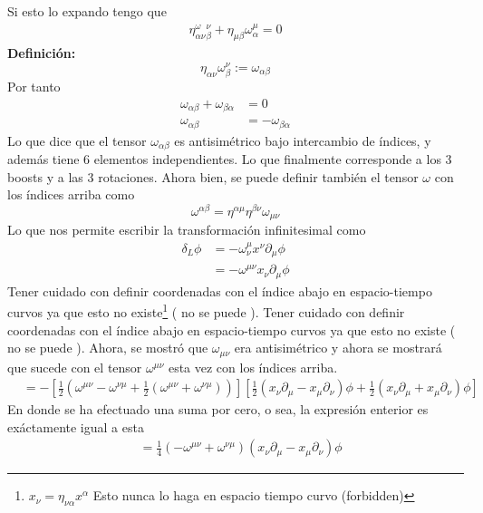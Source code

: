 \documentclass[../main.tex]{subfiles}
\begin{document}
 Si esto lo expando tengo que
 \begin{align*}
   \eta_{\alpha \nu }^\omega^\nu_\beta + \eta_{\mu \beta}\omega^\mu_\alpha = 0
 \end{align*}
 \textbf{Definición:}
 \begin{equation}
   \boxed{ \eta_{\alpha \nu}\omega^\nu_\beta := \omega_{\alpha \beta}}
  \end{equation}
Por tanto
\begin{align*}
  \omega_{\alpha \beta} + \omega_{\beta \alpha}&  = 0 \\
  \omega_{\alpha \beta} & = -\omega_{\beta \alpha}
\end{align*}
Lo que dice que el tensor $\omega_{\alpha \beta}$ es antisimétrico bajo intercambio de índices, y además tiene 6 elementos independientes. Lo que finalmente corresponde a los 3 boosts y a las 3 rotaciones. Ahora bien, se puede definir también el tensor $\omega$ con los índices arriba como
\begin{equation}
  \omega^{\alpha \beta} = \eta^{\alpha \mu} \eta^{\beta \nu}\omega_{\mu \nu}
 \end{equation}
 Lo que nos permite escribir la transformación infinitesimal como
 \begin{align*}
   \delta_L \phi & = -\omega^\mu_\nu x^\nu \partial_\mu \phi \\
   & = -\omega^{\mu \nu} x_\nu \partial_\mu \phi
 \end{align*}
 Tener cuidado con definir coordenadas con el índice abajo en espacio-tiempo curvos ya que esto no existe\footnote{$x_\nu = \eta_{\nu \alpha}x^\alpha$ Esto nunca lo haga en espacio tiempo curvo (forbidden) } ( no se puede ).
 Tener cuidado con definir coordenadas con el índice abajo en espacio-tiempo curvos ya que esto no existe ( no se puede ).
Ahora, se mostró que $\omega_{\mu \nu}$ era antisimétrico y ahora se mostrará que sucede con el tensor $\omega^{\mu\nu}$ esta vez con los índices arriba.
\begin{align*}
  &=-\left[ \frac{1}{2}  \left( \omega^{\mu \nu}-\omega^{\nu \mu} + \frac{1}{2}\left( \omega^{\mu \nu} + \omega^{\nu \mu} \right) \right)\right] \left[ \frac{1}{2}\left( x_\nu \partial_\mu - x_\mu\partial_\nu \right)\phi  + \frac{1}{2}\left( x_\nu\partial_\mu + x_\mu \partial_\nu \right)\phi \right] 
\end{align*}
En donde se ha efectuado una suma por cero, o sea, la expresión enterior es exáctamente igual a esta
\begin{align*}
  &= \frac{1}{4}  \left( -\omega^{\mu \nu}+\omega^{\nu \mu}\right)\left( x_\nu \partial_\mu - x_\mu\partial_\nu \right)\phi
\end{align*}
\end{document}

